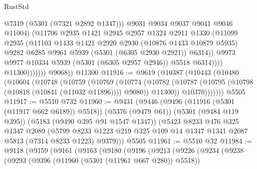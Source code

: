 \begin{lexlean}{RustStd}
\begin{coremodule}
                                @7319
                                (@5301 (@7321 @2892 @1347)))
                              @9031
                              @9034
                              @9037
                              @9041
                              @9046
                              @11004)
                            (@11706
                              @2935
                              @1421
                              @2945
                              @2957
                              @1324
                              @2911
                              @1330
                              (@11099
                                @2935
                                (@11103
                                  @1433
                                  @1421
                                  @2920
                                  @2930
                                  (@10876 @1433 @10879 @5935)
                                  @9282
                                  @6285
                                  @9961
                                  @5939
                                  (@5301 (@6305 @2930 @2921))
                                  @6314))
                              @9973
                              @9977
                              @10334
                              @5939
                              (@5301 (@6305 @2957 @2946))
                              @5518
                              @6314))))
                      @11300)))))))
        @9068))
    @11300
@11916 := @9619
    (@10387
      (@10443
        (@10480
          (@10604
            (@10748
              (@10759
                (@10769
                  (@10774
                    (@10782
                      (@10787 (@10795 (@10798 (@10818 (@10841 (@11032 @11896)))) @9080))
                      @11300))
                  @10370)))))))
    @5505
@11917 := @5510 @732
@11960 := @9431
    (@9446
      (@9496 (@11916 (@5301 (@11917 @662 @6189)) @5518))
      (@5376 (@9479 @61))
      (@5301 (@9484 @119 @395))
      (@5183 (@9490 @395 @91 @1547 @1347))
      (@5423
        @8233
        @476
        @325
        @1347
        @2089
        (@5799 @8233 @1223 @219 @325 @109 @14 @1347 @1341 @2087 @5813 (@7314 @8233 @1223) @9379)))
    @5505
@11961 := @5510 @32
@11984 := @9118
    (@9159
      (@9161
        (@9163
          (@9180
            (@9196
              (@9213
                (@9226
                  (@9234
                    (@9238
                      (@9293
                        (@9396 (@11960 (@5301 (@11961 @667 @280)) @5518))

\end{coremodule}
\end{lexlean}

